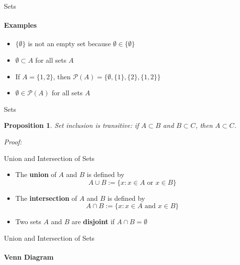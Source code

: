 \documentclass[9pt,aspectratio=169]{beamer}
\newcommand{\pP}{\mathcal P}
\newtheorem{proposition}[theorem]{Proposition}
\begin{document}
\begin{frame}{Sets}
    \framesubtitle{Examples}
    \begin{itemize}
        \item $\{\emptyset\}$ is not an empty set because $\emptyset \in
        \{\emptyset\}$
        \item $\emptyset \subset A$ for all sets $A$
        \item If $A = \{1, 2\}$, then $\pP(A) = \{\emptyset, \{1\}, \{2\},
        \{1, 2\}\}$
        \item $\emptyset \in \pP(A)$ for all sets $A$
    \end{itemize}
\end{frame}

\begin{frame}{Sets}
    \begin{proposition}
        Set inclusion is transitive: if $A \subset B$ and $B \subset C$, then
        $A \subset C$.
    \end{proposition}
    \emph{Proof:} 
\end{frame}

\begin{frame}{Union and Intersection of Sets}
    \begin{definition}
        \begin{itemize}
            \item The \textbf{union} of $A$ and $B$ is defined by
            \begin{equation*}
                A \cup B := \{x: x\in A \text{ or } x\in B\}
            \end{equation*}
            \item The \textbf{intersection} of $A$ and $B$ is defined by
            \begin{equation*}
                A \cap B := \{x: x\in A \text{ and } x\in B\}
            \end{equation*}
            \item Two sets $A$ and $B$ are \textbf{disjoint} if $A \cap B =
            \emptyset$ 
        \end{itemize}
    \end{definition}
\end{frame}

\begin{frame}{Union and Intersection of Sets}
    \framesubtitle{Venn Diagram}
\end{frame}
\end{document}
